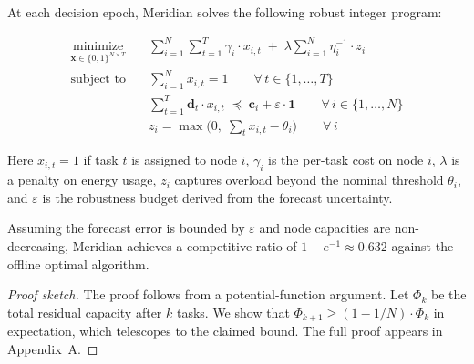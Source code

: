 At each decision epoch, Meridian solves the following robust integer program:

\begin{equation}
\label{eq:rip}
\begin{aligned}
\operatorname*{minimize}_{\mathbf{x} \in \{0,1\}^{N \times T}} \quad
  & \sum_{i=1}^{N} \sum_{t=1}^{T} \gamma_i \cdot x_{i,t}
  \;+\;
  \lambda \sum_{i=1}^{N} \eta_i^{-1} \cdot z_i \\[6pt]
\text{subject to} \quad
  & \sum_{i=1}^{N} x_{i,t} = 1 \qquad \forall\, t \in \{1,\dots,T\} \\
  & \sum_{t=1}^{T} \mathbf{d}_t \cdot x_{i,t}
      \;\preceq\; \mathbf{c}_i + \varepsilon\cdot \mathbf{1}
      \qquad \forall\, i \in \{1,\dots,N\} \\
  & z_i = \max\!\bigl(0,\; \textstyle\sum_{t} x_{i,t} - \theta_i\bigr)
      \qquad \forall\, i
\end{aligned}
\end{equation}

Here \(x_{i,t}=1\) if task \(t\) is assigned to node \(i\), \(\gamma_i\) is the
per-task cost on node \(i\), \(\lambda\) is a penalty on energy usage, \(z_i\)
captures overload beyond the nominal threshold \(\theta_i\), and \(\varepsilon\)
is the robustness budget derived from the forecast uncertainty.

\begin{theorem}
\label{thm:competitive}
Assuming the forecast error is bounded by \(\varepsilon\) and node capacities
are non-decreasing, Meridian achieves a competitive ratio of
\(1 - e^{-1} \approx 0.632\) against the offline optimal algorithm.
\end{theorem}

\begin{proof}[Proof sketch]
The proof follows from a potential-function argument. Let \(\Phi_k\)
be the total residual capacity after \(k\) tasks. We show that
\(\Phi_{k+1} \geq (1 - 1/N) \cdot \Phi_k\) in expectation, which telescopes
to the claimed bound. The full proof appears in Appendix~A.
\end{proof}

